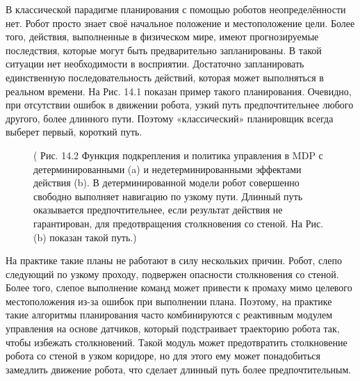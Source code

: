 \documentclass[10pt,a4paper]{article}
\begin{document}
В классической парадигме планирования с помощью роботов неопределённости нет. Робот просто знает своё начальное положение и местоположение цели. Более того, действия, выполненные в физическом мире, имеют прогнозируемые последствия, которые могут быть предварительно запланированы. В такой ситуации нет необходимости в восприятии.  Достаточно запланировать единственную последовательность действий, которая может выполняться в реальном времени. На Рис. 14.1 показан пример такого планирования. Очевидно, при отсутствии ошибок в движении робота, узкий путь предпочтительнее любого другого, более длинного пути. Поэтому «классический» планировщик всегда выберет первый, короткий путь.

\begin{figure}[H]
	\caption{ ( Рис. 14.2 Функция подкрепления и политика управления в MDP с детерминированными (a) и недетерминированными эффектами действия (b). В детерминированной модели робот совершенно свободно выполняет навигацию по узкому пути. Длинный путь оказывается предпочтительнее, если результат действия не гарантирован, для предотвращения столкновения со стеной. На Рис. (b) показан такой путь.) }
	\label{fig:142orig}
\end{figure}

На практике такие планы не работают в силу нескольких причин. Робот, слепо следующий по узкому проходу, подвержен опасности столкновения со стеной. Более того, слепое выполнение команд может привести к промаху мимо целевого местоположения из-за ошибок при выполнении плана. Поэтому, на практике такие алгоритмы планирования часто комбинируются с реактивным модулем управления на основе датчиков, который подстраивает траекторию робота так, чтобы избежать столкновений. Такой модуль может предотвратить столкновение робота со стеной в узком коридоре, но для этого ему может понадобиться замедлить движение робота, что сделает длинный путь более предпочтительным.\\
\end{document}
